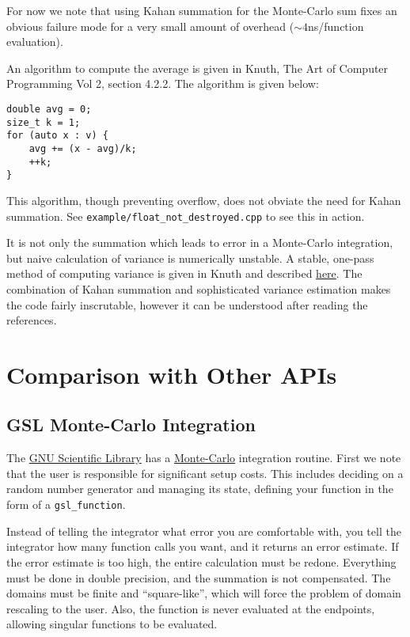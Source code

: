 \documentclass[landscape]{article}
\numberwithin{equation}{section}
\begin{document}
For now we note that using Kahan summation for the Monte-Carlo sum fixes an obvious failure mode for a very small amount of overhead (${\sim}4$ns/function evaluation).

An algorithm to compute the average is given in Knuth, The Art of Computer Programming Vol 2, section 4.2.2.
The algorithm is given below:
\begin{verbatim}
double avg = 0;
size_t k = 1;
for (auto x : v) {
	avg += (x - avg)/k;
	++k;
}
\end{verbatim}
This algorithm, though preventing overflow, does not obviate the need for Kahan summation. See \texttt{example/float\_not\_destroyed.cpp} to see this in action.

It is not only the summation which leads to error in a Monte-Carlo integration, but naive calculation of variance is numerically unstable.
A stable, one-pass method of computing variance is given in Knuth and described \href{https://www.johndcook.com/blog/standard_deviation/}{here}.
The combination of Kahan summation and sophisticated variance estimation makes the code fairly inscrutable, however it can be understood after reading the references.

\section{Comparison with Other APIs}
\subsection{GSL Monte-Carlo Integration}

The \href{https://www.gnu.org/software/gsl/}{GNU Scientific Library} has a \href{https://www.gnu.org/software/gsl/doc/html/montecarlo.html}{Monte-Carlo} integration routine.
First we note that the user is responsible for significant setup costs.
This includes deciding on a random number generator and managing its state, defining your function in the form of a \texttt{gsl\_function}.

Instead of telling the integrator what error you are comfortable with, you tell the integrator how many function calls you want, and it returns an error estimate.
If the error estimate is too high, the entire calculation must be redone.
Everything must be done in double precision, and the summation is not compensated.
The domains must be finite and ``square-like'', which will force the problem of domain rescaling to the user. Also, the function is never evaluated at the endpoints, allowing singular functions to be evaluated.
\end{document}
